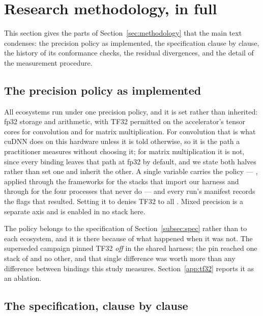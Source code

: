 \section{Research methodology, in full}
\label{app:methodology}

This section gives the parts of Section~\ref{sec:methodology} that the main text
condenses: the precision policy as implemented, the specification clause by
clause, the history of its conformance checks, the residual divergences, and the
detail of the measurement procedure.

\subsection{The precision policy as implemented}
\label{app:precision-policy}

All \vEcosystems{} ecosystems run under one precision policy, and it is set
rather than inherited: fp32 storage and arithmetic, with TF32 permitted on the
accelerator's tensor cores for convolution and for matrix multiplication. For
convolution that is what cuDNN does on this hardware unless it is told
otherwise, so it is the path a practitioner measures without choosing it; for
matrix multiplication it is not, since every binding leaves that path at fp32 by
default, and we state both halves rather than set one and inherit the other. A
single variable carries the policy --- , applied through
the frameworks for the stacks that import our harness and through
 for the four processes that never do --- and every
run's manifest records the flags that resulted. Setting it to  denies
TF32 to all \vEcosystems{}. Mixed precision is a separate axis and is enabled in
no stack here.

The policy belongs to the specification of Section~\ref{subsec:spec} rather than
to each ecosystem, and it is there because of what happened when it was not. The
superseded campaign pinned TF32 \emph{off} in the shared harness;
the pin reached one stack of \vEcosystems{} and no other, and that single
difference was worth more than any difference between bindings this study
measures. Section~\ref{app:tf32} reports it as an ablation.

\subsection{The specification, clause by clause}
\label{app:spec}

